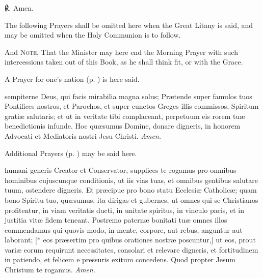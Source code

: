 ℟. Amen.
 \begin{rubric}
     The following Prayers shall be omitted here when the Great Litany is said, and may be omitted when the Holy Communion is to follow.
 \end{rubric}
\begin{rubric}
    And \textsc{Note}, That the Minister may here end the Morning Prayer with such intercessions taken out of this Book, as he shall think fit, or with the Grace.
\end{rubric}
\vspace{-2ex}
\begin{rubric}
    A Prayer for one's nation (p. \pageref{prayers}) is here said.
\end{rubric}
\vspace{-2ex}
 sempiterne Deus, qui facis mirabilia magna solus; Prætende super famulos tuos Pontifices nostros, et Parochos, et super cunctos Greges illis commissos, Spiritum gratiæ salutaris; et ut in veritate tibi complaceant, perpetuum eis rorem tuæ benedictionis infunde. Hoc quæsumus Domine, donare digneris, in honorem Advocati et Mediatoris nostri Jesu Christi. \textit{Amen.}
\begin{rubric}
    Additional Prayers (p. \pageref{prayers}) may be said here.
\end{rubric}
\vspace{-2ex}
 humani generis Creator et Conservator, supplices te rogamus pro omnibus hominibus cujuscunque conditionis, ut iis vias tuas, et omnibus gentibus salutare tuum, ostendere digneris. Et præcipue pro bono statu Ecclesiæ Catholicæ; quam bono Spiritu tuo, quæsumus, ita dirigas et gubernes, ut omnes qui se Christianos profitentur, in viam veritatis ducti, in unitate spiritus, in vinculo pacis, et in justitia vitæ fidem teneant. Postremo paternæ bonitati tuæ omnes illos commendamus qui quovis modo, in mente, corpore, aut rebus, anguntur aut laborant; [* eos præsertim pro quibus orationes nostræ poscuntur,] ut eos, prout variæ eorum requirunt necessitates, consolari et relevare digneris, et fortitudinem in patiendo, et felicem e pressuris exitum concedens. Quod propter Jesum Christum te rogamus. \textit{Amen.}
